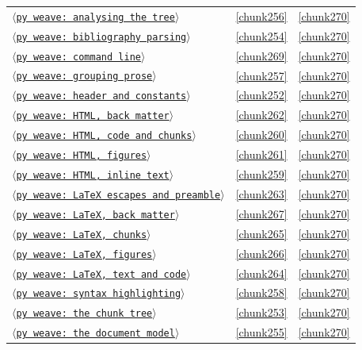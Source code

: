 \documentclass[10pt,a4paper]{article}
\newcounter{chunk}
\newcommand{\chunkname}[1]{\ensuremath{\langle}\texttt{#1}\ensuremath{\rangle}}
\begin{document}
\begin{longtable}{@{}p{}rp{}@{}}
\hyperref[chunk256]{\chunkname{py weave: analysing the tree}} & \ref*{chunk256} & \hyperref[chunk270]{\ref*{chunk270}} \\
\hyperref[chunk254]{\chunkname{py weave: bibliography parsing}} & \ref*{chunk254} & \hyperref[chunk270]{\ref*{chunk270}} \\
\hyperref[chunk269]{\chunkname{py weave: command line}} & \ref*{chunk269} & \hyperref[chunk270]{\ref*{chunk270}} \\
\hyperref[chunk257]{\chunkname{py weave: grouping prose}} & \ref*{chunk257} & \hyperref[chunk270]{\ref*{chunk270}} \\
\hyperref[chunk252]{\chunkname{py weave: header and constants}} & \ref*{chunk252} & \hyperref[chunk270]{\ref*{chunk270}} \\
\hyperref[chunk262]{\chunkname{py weave: HTML, back matter}} & \ref*{chunk262} & \hyperref[chunk270]{\ref*{chunk270}} \\
\hyperref[chunk260]{\chunkname{py weave: HTML, code and chunks}} & \ref*{chunk260} & \hyperref[chunk270]{\ref*{chunk270}} \\
\hyperref[chunk261]{\chunkname{py weave: HTML, figures}} & \ref*{chunk261} & \hyperref[chunk270]{\ref*{chunk270}} \\
\hyperref[chunk259]{\chunkname{py weave: HTML, inline text}} & \ref*{chunk259} & \hyperref[chunk270]{\ref*{chunk270}} \\
\hyperref[chunk263]{\chunkname{py weave: LaTeX escapes and preamble}} & \ref*{chunk263} & \hyperref[chunk270]{\ref*{chunk270}} \\
\hyperref[chunk267]{\chunkname{py weave: LaTeX, back matter}} & \ref*{chunk267} & \hyperref[chunk270]{\ref*{chunk270}} \\
\hyperref[chunk265]{\chunkname{py weave: LaTeX, chunks}} & \ref*{chunk265} & \hyperref[chunk270]{\ref*{chunk270}} \\
\hyperref[chunk266]{\chunkname{py weave: LaTeX, figures}} & \ref*{chunk266} & \hyperref[chunk270]{\ref*{chunk270}} \\
\hyperref[chunk264]{\chunkname{py weave: LaTeX, text and code}} & \ref*{chunk264} & \hyperref[chunk270]{\ref*{chunk270}} \\
\hyperref[chunk258]{\chunkname{py weave: syntax highlighting}} & \ref*{chunk258} & \hyperref[chunk270]{\ref*{chunk270}} \\
\hyperref[chunk253]{\chunkname{py weave: the chunk tree}} & \ref*{chunk253} & \hyperref[chunk270]{\ref*{chunk270}} \\
\hyperref[chunk255]{\chunkname{py weave: the document model}} & \ref*{chunk255} & \hyperref[chunk270]{\ref*{chunk270}} \\

\end{longtable}
\end{document}
